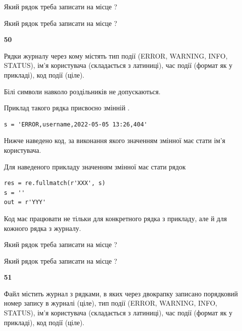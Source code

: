 Який рядок треба записати на місце  ?\par
\vspace{5mm}


Який рядок треба записати на місце  ?\par


\newpage

{\begin {center}\textbf{ 50}\end {center}}\par
Рядки журналу через кому містять тип події (ERROR, WARNING, INFO, STATUS), ім'я користувача (складається з латиниці), час події (фор\-мат як у прикладі), код події (ціле).

Білі символи навколо роздільників не допускаються.

Приклад такого рядка присвоєно змінній .



\begin{verbatim}
s = 'ERROR,username,2022-05-05 13:26,404'
\end{verbatim}


Нижче наведено код, за виконання якого значенням змінної  має стати ім'я користувача.

Для наведеного прикладу значенням змінної  має стати рядок 



\begin{verbatim}
res = re.fullmatch(r'XXX', s)
s = ''
out = r'YYY'
\end{verbatim}


Код має працювати не тільки для конкретного рядка з прикладу, але й для кожного рядка з журналу.




Який рядок треба записати на місце  ?\par
\vspace{5mm}


Який рядок треба записати на місце  ?\par


\newpage

{\begin {center}\textbf{ 51}\end {center}}\par
Файл  містить журнал з рядками, в яких через двокрапку записано поряд\-ко\-вий номер запису в журналі (ціле), тип події (ERROR, WARNING, INFO, STATUS), ім'я користувача (складається з латиниці), час події (фор\-мат як у прикладі), код події (ціле).

